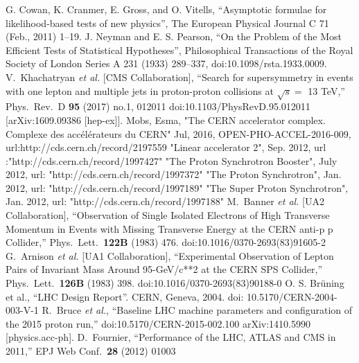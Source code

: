 \begin{thebibliography}{9}
G. Cowan, K. Cranmer, E. Gross, and O. Vitells, “Asymptotic formulae for likelihood-based tests of new physics”, The European Physical Journal C 71 (Feb., 2011) 1–19.
J. Neyman and E. S. Pearson, “On the Problem of the Most Efficient Tests of Statistical Hypotheses”, Philosophical Transactions of the Royal Society of London Series A 231 (1933) 289–337, doi:10.1098/rsta.1933.0009.
  V.~Khachatryan {\it et al.} [CMS Collaboration],
  ``Search for supersymmetry in events with one lepton and multiple jets in proton-proton collisions at $\sqrt s =$ 13 TeV,''
  Phys.\ Rev.\ D {\bf 95} (2017) no.1,  012011
  doi:10.1103/PhysRevD.95.012011
  [arXiv:1609.09386 [hep-ex]].
Mobs, Esma,
"The CERN accelerator complex. Complexe des acc{\'e}l{\'e}rateurs du CERN"
Jul, 2016, OPEN-PHO-ACCEL-2016-009, url:http://cds.cern.ch/record/2197559
   "Linear accelerator 2",
    Sep. 2012,
    url :"http://cds.cern.ch/record/1997427"
"The Proton Synchrotron Booster",
July 2012,
 url: "http://cds.cern.ch/record/1997372"
"The Proton Synchrotron",
Jan. 2012,
url: "http://cds.cern.ch/record/1997189"
"The Super Proton Synchrotron",
Jan. 2012,
url: "http://cds.cern.ch/record/1997188"
M.~Banner {\it et al.} [UA2 Collaboration],
  ``Observation of Single Isolated Electrons of High Transverse Momentum in Events with Missing Transverse Energy at the CERN anti-p p Collider,''
  Phys.\ Lett.\  {\bf 122B} (1983) 476.
  doi:10.1016/0370-2693(83)91605-2
  G.~Arnison {\it et al.} [UA1 Collaboration],
  ``Experimental Observation of Lepton Pairs of Invariant Mass Around 95-GeV/c**2 at the CERN SPS Collider,''
  Phys.\ Lett.\  {\bf 126B} (1983) 398.
  doi:10.1016/0370-2693(83)90188-0
O. S. Brüning et al., “LHC Design Report”. CERN, Geneva, 2004. doi: 10.5170/CERN-2004-003-V-1
 R.~Bruce {\it et al.},
  ``Baseline LHC machine parameters and configuration of the 2015 proton run,''
  doi:10.5170/CERN-2015-002.100
  arXiv:1410.5990 [physics.acc-ph].
 D.~Fournier,
  ``Performance of the LHC, ATLAS and CMS in 2011,''
  EPJ Web Conf.\  {\bf 28} (2012) 01003

\end{thebibliography}
